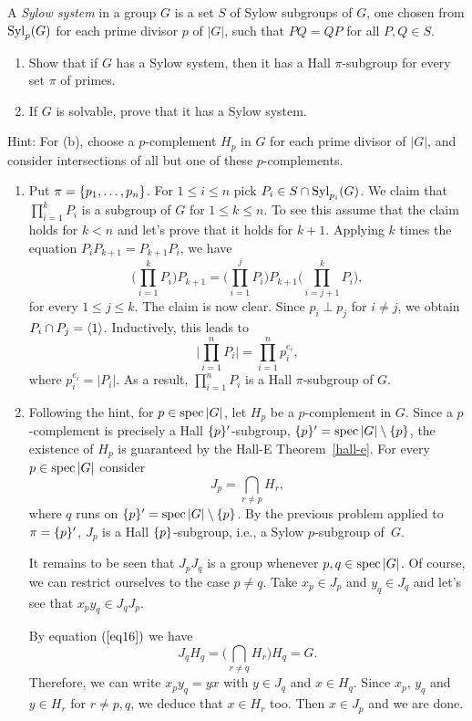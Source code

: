 \begin{probl}
    A \textsl{Sylow system} in a group\/ $G$ is a set\/ $S$ of Sylow subgroups of\/ $G$, one chosen from\/ ${\rm Syl}_p(G)$ for each prime divisor\/ $p$ of\/ $|G|$, such that\/ $PQ = QP$ for all\/ $P,Q \in S$.
    \begin{enumerate}[\rm a)]
    \item Show that if\/ $G$ has a Sylow system, then it has a Hall\/ $\pi$-subgroup for every set\/ $\pi$ of primes.
    \item If\/ $G$ is solvable, prove that it has a Sylow system.
    \end{enumerate}
    \textrm{\rm Hint: For (b), choose a $p$-complement $H_p$ in $G$ for each prime divisor of $|G|$, and consider intersections of all but one of these $p$-complements.}
\end{probl}

\begin{solution}

\begin{enumerate}[\rm a)]
    \item Put $\pi=\{p_1,\dots,p_n\}$. For $1\le i\le n$ pick $P_i\in S\cap{\rm Syl}_{p_i}(G)$. We claim that $\prod_{i=1}^kP_i$ is a subgroup of $G$ for $1\le k\le n$. To see this assume that the claim holds for $k<n$ and let's prove that it holds for $k+1$. Applying $k$ times the equation $P_iP_{k+1}=P_{k+1}P_i$, we have
    $$
        \Big(\prod_{i=1}^kP_i\Big)P_{k+1}
            = \Big(\prod_{i=1}^jP_i\Big)P_{k+1}\Big(\prod_{i=j+1}^kP_i\Big),
    $$
    for every $1\le j\le k$. The claim is now clear. Since $p_i\perp p_j$ for $i\ne j$, we obtain $P_i\cap P_j=\langle1\rangle$. Inductively, this leads to
    $$
        \Big|\prod_{i=1}^nP_i\Big| = \prod_{i=1}^np_i^{e_i},
    $$
    where $p_i^{e_i}=|P_i|$. As a result, $\prod_{i=1}^nP_i$ is a Hall $\pi$-subgroup of $G$.

    \item Following the hint, for $p\in\operatorname{spec}|G|$, let $H_p$ be a $p$-complement in $G$. Since a $p$-complement is precisely a Hall $\{p\}'$-subgroup, $\{p\}'=\operatorname{spec}|G|\setminus\{p\}$, the existence of $H_p$ is guaranteed by the Hall-E Theorem~\ref{hall-e}. For every $p\in\operatorname{spec}|G|$ consider
    $$
        J_p = \bigcap_{r\ne p}H_r,
    $$
    where $q$ runs on $\{p\}'=\operatorname{spec}|G|\setminus\{p\}$. By the previous problem applied to $\pi=\{p\}'$, $J_p$ is a Hall $\{p\}$-subgroup, i.e., a Sylow $p$-subgroup of~$G$.

    It remains to be seen that $J_pJ_q$ is a group whenever $p,q\in\operatorname{spec}|G|$. Of course, we can restrict ourselves to the case $p\ne q$. Take $x_p\in J_p$ and $y_q\in J_q$ and let's see that $x_py_q\in J_qJ_p$. 
    
    By equation $(\ref{eq16})$ we have
    $$
        J_qH_q=\Big(\bigcap_{r\ne q}H_r\Big)H_q = G.
    $$
    Therefore, we can write $x_py_q=yx$ with $y\in J_q$ and $x\in H_q$. Since $x_p$, $y_q$ and $y\in H_r$ for $r\ne p,q$, we deduce that $x\in H_r$ too. Then $x\in J_p$ and we are done.
\end{enumerate}
\end{solution}

